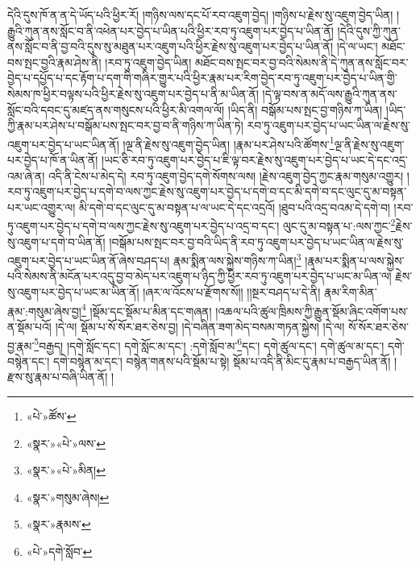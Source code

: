 དེའི་དུས་ཁོ་ན་ན་དེ་ཡོད་པའི་ཕྱིར་རོ། །གཉིས་ལས་དང་པོ་རབ་འཇུག་བྱེད། །གཉིས་པ་རྗེས་སུ་འཇུག་བྱེད་ཡིན། །རྒྱུའི་ཀུན་ནས་སློང་བ་ནི་འཕེན་པར་བྱེད་པ་ཡིན་པའི་ཕྱིར་རབ་ཏུ་འཇུག་པར་བྱེད་པ་ཡིན་ནོ། །དེའི་དུས་ཀྱི་ཀུན་ནས་སློང་བ་ནི་བྱ་བའི་དུས་སུ་མཐུན་པར་འཇུག་པའི་ཕྱིར་རྗེས་སུ་འཇུག་པར་བྱེད་པ་ཡིན་ནོ། །དེ་ལ་ཡང་། མཐོང་བས་སྤང་བྱའི་རྣམ་ཤེས་ནི། །རབ་ཏུ་འཇུག་བྱེད་ཡིན། མཐོང་བས་སྤང་བར་བྱ་བའི་སེམས་ནི་དེ་ཀུན་ནས་སློང་བར་བྱེད་པ་དཔྱོད་པ་དང་རྟོག་པ་དག་གི་གཞིར་གྱུར་པའི་ཕྱིར་རྣམ་པར་རིག་བྱེད་རབ་ཏུ་འཇུག་པར་བྱེད་པ་ཡིན་གྱི་སེམས་ཁ་ཕྱིར་བལྟས་པའི་ཕྱིར་རྗེས་སུ་འཇུག་པར་བྱེད་པ་ནི་མ་ཡིན་ནོ། །དེ་ལྟ་བས་ན་མདོ་ལས་རྒྱུའི་ཀུན་ནས་སློང་བའི་དབང་དུ་མཛད་ནས་གསུངས་པའི་ཕྱིར་མི་འགལ་ལོ། །ཡིད་ནི། བསྒོམ་པས་སྤང་བྱ་གཉིས་ཀ་ཡིན། །ཡིད་ཀྱི་རྣམ་པར་ཤེས་པ་བསྒོམ་པས་སྤང་བར་བྱ་བ་ནི་གཉིས་ཀ་ཡིན་ཏེ། རབ་ཏུ་འཇུག་པར་བྱེད་པ་ཡང་ཡིན་ལ་རྗེས་སུ་འཇུག་པར་བྱེད་པ་ཡང་ཡིན་ནོ། །ལྔ་ནི་རྗེས་སུ་འཇུག་བྱེད་ཡིན། །རྣམ་པར་ཤེས་པའི་ཚོགས་\footnote{«པེ་»ཚོས་}ལྔ་ནི་རྗེས་སུ་འཇུག་པར་བྱེད་པ་ཁོ་ན་ཡིན་ནོ། །ཡང་ཅི་རབ་ཏུ་འཇུག་པར་བྱེད་པ་ཇི་ལྟ་བར་རྗེས་སུ་འཇུག་པར་བྱེད་པ་ཡང་དེ་དང་འདྲ་འམ་ཞེ་ན། འདི་ནི་ངེས་པ་མེད་དེ། རབ་ཏུ་འཇུག་བྱེད་དགེ་སོགས་ལས། །རྗེས་འཇུག་བྱེད་ཀྱང་རྣམ་གསུམ་འགྱུར། །རབ་ཏུ་འཇུག་པར་བྱེད་པ་དགེ་བ་ལས་ཀྱང་རྗེས་སུ་འཇུག་པར་བྱེད་པ་དགེ་བ་དང་མི་དགེ་བ་དང་ལུང་དུ་མ་བསྟན་པར་ཡང་འགྱུར་ལ། མི་དགེ་བ་དང་ལུང་དུ་མ་བསྟན་པ་ལ་ཡང་དེ་དང་འདྲའོ། །ཐུབ་པའི་འདྲ་བའམ་དེ་དགེ་བ། །རབ་ཏུ་འཇུག་པར་བྱེད་པ་དགེ་བ་ལས་ཀྱང་རྗེས་སུ་འཇུག་པར་བྱེད་པ་འདྲ་བ་དང་། ལུང་དུ་མ་བསྟན་པ་:ལས་ཀྱང་\footnote{«སྣར་»«པེ་»ལས་}རྗེས་སུ་འཇུག་པ་དགེ་བ་ཡིན་ནོ། །བསྒོམ་པས་སྤང་བར་བྱ་བའི་ཡིད་ནི་རབ་ཏུ་འཇུག་པར་བྱེད་པ་ཡང་ཡིན་ལ་རྗེས་སུ་འཇུག་པར་བྱེད་པ་ཡང་ཡིན་ནོ་ཞེས་བཤད་པ། རྣམ་སྨིན་ལས་སྐྱེས་གཉིས་ཀ་ཡིན།\footnote{«སྣར་»«པེ་»མིན།} །རྣམ་པར་སྨིན་པ་ལས་སྐྱེས་པའི་སེམས་ནི་མངོན་པར་འདུ་བྱ་བ་མེད་པར་འཇུག་པ་ཉིད་ཀྱི་ཕྱིར་རབ་ཏུ་འཇུག་པར་བྱེད་པ་ཡང་མ་ཡིན་ལ། རྗེས་སུ་འཇུག་པར་བྱེད་པ་ཡང་མ་ཡིན་ནོ། །ཞར་ལ་འོངས་པ་རྫོགས་སོ།། །།སྔར་བཤད་པ་དེ་ནི། རྣམ་རིག་མིན་རྣམ་:གསུམ་ཞེས་བྱ།\footnote{«སྣར་»གསུམ་ཞེས།} །སྡོམ་དང་སྡོམ་པ་མིན་དང་གཞན། །འཆལ་པའི་ཚུལ་ཁྲིམས་ཀྱི་རྒྱུན་སྡོམ་ཞིང་འགོག་པས་ན་སྡོམ་པའོ། །དེ་ལ། སྡོམ་པ་སོ་སོར་ཐར་ཅེས་བྱ། །དེ་བཞིན་ཟག་མེད་བསམ་གཏན་སྐྱེས། །དེ་ལ། སོ་སོར་ཐར་ཅེས་བྱ་རྣམ་\footnote{«སྣར་»རྣམས་}བརྒྱད། །དགེ་སློང་དང་། དགེ་སློང་མ་དང་། :དགེ་སློབ་མ་\footnote{«པེ་»དགེ་སློབ་}དང་། དགེ་ཚུལ་དང་། དགེ་ཚུལ་མ་དང་། དགེ་བསྙེན་དང་། དགེ་བསྙེན་མ་དང་། བསྙེན་གནས་པའི་སྡོམ་པ་སྟེ། སྡོམ་པ་འདི་ནི་མིང་དུ་རྣམ་པ་བརྒྱད་ཡིན་ནོ། །རྫས་སུ་རྣམ་པ་བཞི་ཡིན་ནོ། །
